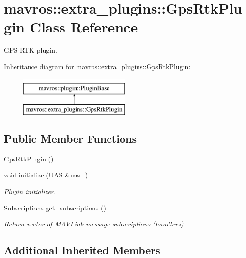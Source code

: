 \hypertarget{classmavros_1_1extra__plugins_1_1GpsRtkPlugin}{}\section{mavros\+::extra\+\_\+plugins\+::Gps\+Rtk\+Plugin Class Reference}
\label{classmavros_1_1extra__plugins_1_1GpsRtkPlugin}


G\+PS R\+TK plugin.  


Inheritance diagram for mavros\+::extra\+\_\+plugins\+::Gps\+Rtk\+Plugin\+:\begin{figure}[H]
\begin{center}
\leavevmode
\includegraphics[height=2.000000cm]{classmavros_1_1extra__plugins_1_1GpsRtkPlugin}
\end{center}
\end{figure}
\subsection*{Public Member Functions}
\begin{DoxyCompactItemize}
\item 
\mbox{\hyperlink{group__plugin_ga6a5cb4aec8a08bcfb3994274de9a085c}{Gps\+Rtk\+Plugin}} ()
\item 
void \mbox{\hyperlink{group__plugin_ga4d0ded3217149d886fba09768c5093ca}{initialize}} (\mbox{\hyperlink{classmavros_1_1UAS}{U\+AS}} \&uas\+\_\+)
\begin{DoxyCompactList}\small\item\em Plugin initializer. \end{DoxyCompactList}\item 
\mbox{\hyperlink{group__plugin_ga8967d61fc77040e0c3ea5a4585d62a09}{Subscriptions}} \mbox{\hyperlink{group__plugin_ga21af691b0770c7e0b87e5fd733b0145a}{get\+\_\+subscriptions}} ()
\begin{DoxyCompactList}\small\item\em Return vector of M\+A\+V\+Link message subscriptions (handlers) \end{DoxyCompactList}\end{DoxyCompactItemize}
\subsection*{Additional Inherited Members}


